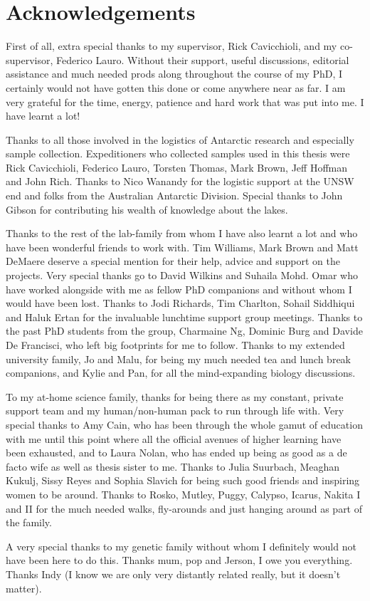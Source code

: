 \chapter*{Acknowledgements}
First of all, extra special thanks to my supervisor, Rick Cavicchioli, and my co-supervisor, Federico Lauro.
Without their support, useful discussions, editorial assistance and much needed prods along throughout the course of my PhD, I certainly would not have gotten this done or come anywhere near as far.
I am very grateful for the time, energy, patience and hard work that was put into me.
I have learnt a lot!

Thanks to all those involved in the logistics of Antarctic research and especially sample collection.
Expeditioners who collected samples used in this thesis were Rick Cavicchioli, Federico Lauro, Torsten Thomas, Mark Brown, Jeff Hoffman and John Rich.
Thanks to Nico Wanandy for the logistic support at the UNSW end and folks from the Australian Antarctic Division.
Special thanks to John Gibson for contributing his wealth of knowledge about the lakes.

Thanks to the rest of the lab-family from whom I have also learnt a lot and who have been wonderful friends to work with.
Tim Williams, Mark Brown and Matt DeMaere deserve a special mention for their help, advice and support on the projects.
Very special thanks go to David Wilkins and Suhaila Mohd. Omar who have worked alongside with me as fellow PhD companions and without whom I would have been lost.
Thanks to Jodi Richards, Tim Charlton, Sohail Siddhiqui and Haluk Ertan for the invaluable lunchtime support group meetings.
Thanks to the past PhD students from the group, Charmaine Ng, Dominic Burg and Davide De Francisci, who left big footprints for me to follow.
Thanks to my extended university family, Jo and Malu, for being my much needed tea and lunch break companions, and Kylie and Pan, for all the mind-expanding biology discussions.

To my at-home science family, thanks for being there as my constant, private support team and my human/non-human pack to run through life with.
Very special thanks to Amy Cain, who has been through the whole gamut of education with me until this point where all the official avenues of higher learning have been exhausted, and to Laura Nolan, who has ended up being as good as a de facto wife as well as thesis sister to me.
Thanks to Julia Suurbach, Meaghan Kukulj, Sissy Reyes and Sophia Slavich for being such good friends and inspiring women to be around.
Thanks to Rosko, Mutley, Puggy, Calypso, Icarus, Nakita I and II for the much needed walks, fly-arounds and just hanging around as part of the family.

A very special thanks to my genetic family without whom I definitely would not have been here to do this.
Thanks mum, pop and Jerson, I owe you everything.
Thanks Indy (I know we are only very distantly related really, but it doesn't matter).
